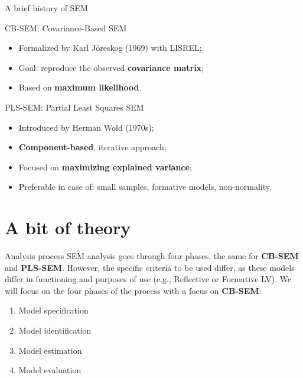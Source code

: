 \documentclass{beamer}
\begin{document}
\begin{frame}{A brief history of SEM}
    \begin{block}{CB-SEM: Covariance-Based SEM}
        \begin{itemize}
            \item Formalized by Karl Jöreskog (1969) with LISREL;
            \item Goal: reproduce the observed \textbf{covariance matrix};
            \item Based on \textbf{maximum likelihood}.
        \end{itemize}
    \end{block}
    \begin{block}{PLS-SEM: Partial Least Squares SEM}
        \begin{itemize}
            \item Introduced by Herman Wold (1970s);
            \item \textbf{Component-based}, iterative approach;
            \item Focused on \textbf{maximizing explained variance};
            \item Preferable in case of: small samples, formative models, non-normality.
        \end{itemize}
    \end{block}
\end{frame}

\section{A bit of theory}
\begin{frame}{Analysis process}
    SEM analysis goes through four phases, the same for \textbf{CB-SEM} and \textbf{PLS-SEM}. However, the specific criteria to be used differ, as these models differ in functioning and purposes of use (e.g., Reflective or Formative LV). We will focus on the four phases of the process with a focus on \textbf{CB-SEM}: \\
    \vspace{1em}
    \begin{enumerate}
        \item Model specification
        \item Model identification
        \item Model estimation
        \item Model evaluation
    \end{enumerate} 
\end{frame}
\end{document}
